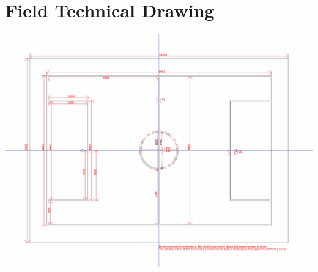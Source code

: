 \documentclass[12pt]{article}
\begin{document}
\section{Field Technical Drawing}
\label{apx:technical-drawing}
\centerline{\includegraphics[angle=90,origin=c,width=\columnwidth]{figs/fieldDimensions2020_technical.pdf}}

\end{document}
